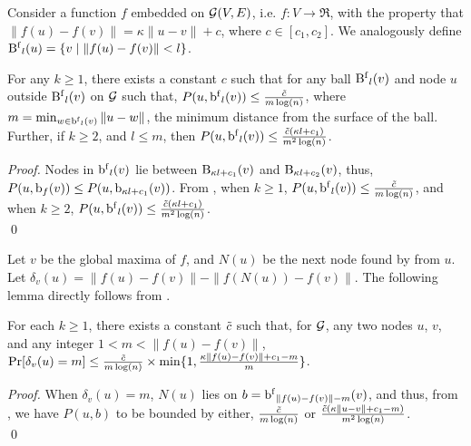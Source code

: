 Consider a function $f$ embedded on $\mathcal{G}(V,E)$, i.e. $f : V \to \Re$, with
the property that $\|f(u) - f(v)\| = \kappa\|u - v\| + c$, where $c \in [c_1,
c_2]$. We analogously define $\operatorname{B^{f}}_l(u) = \{ v \mid \|f(u) - f(v)\| < l \}$. 

\begin{lemma}
    \label{lm:link-to-ballf}
    For any $k \ge 1$, there exists a constant $c$ such that for any ball
    $\operatorname{B^{f}}_l(v)$ and node $u$ outside $\operatorname{B^{f}}_l(v)$ on $\mathcal{G}$ such that,
    $P(u,\operatorname{b^{f}}_l(v)) \le \frac {\tilde{c}}{m\log(n)}$, where $m = \min_{w \in
    \operatorname{b^{f}}_l(v)} \|u-w\|$, the minimum distance from the surface of the ball.
    Further, if $k \ge 2$, and $l \le m$, then $P(u,\operatorname{b^{f}}_l(v)) \le \frac
    {\tilde{c}(\kappa l+c_1)}{m^2\log(n)}$. 
\end{lemma}
\begin{proof}
    Nodes in $\operatorname{b^{f}}_l(v)$ lie between $\operatorname{B}_{\kappa l+c_1}(v)$ and
    $\operatorname{B}_{\kappa l+c_2}(v)$, thus, $P(u,\operatorname{b}_f(v)) \le  P(u,\operatorname{b}_{\kappa l+c_1}(v))$.
    From , when $k \ge 1$, $P(u,\operatorname{b^{f}}_l(v)) \le \frac
    {\tilde{c}}{m\log(n)}$, and when $k \ge 2$, $P(u,\operatorname{b^{f}}_l(v)) \le \frac
    {\tilde{c}(\kappa l+c_1)}{m^2\log(n)}$.
    \\ \qed
\end{proof}


Let $v$ be the global maxima of $f$, and $N(u)$ be the next node found by
\greedyalgo from $u$. Let $\delta_v(u) = \|f(u)-f(v)\| - \|f(N(u))-f(v)\|$. The following lemma
directly follows from .

\begin{lemma}
    \label{lm:rate}
    For each $k \ge 1$, there exists a constant $\tilde{c}$ such that, for
    $\mathcal{G}$, any two nodes $u$, $v$, and any integer $1 < m < \|f(u) - f(v)\|$,
    $\Pr[ \delta_v(u) = m ] \le \frac{\tilde{c}}{m \log(n)} \times \min \{ 1,
    \frac{ \kappa\|f(u)-f(v)\| + c_1 - m }{m} \}$.
\end{lemma}
\begin{proof}
    When $\delta_v(u) = m$,  $N(u)$ lies on $b = \operatorname{b^{f}}_{\|f(u)-f(v)\| -
    m}(v)$, and thus, from , we have $P(u,b)$ to be
    bounded by either, $\frac {\tilde{c}}{m\log(n)}$ or $\frac {\tilde{c}(\kappa\|u -
    v\| + c_1 - m)}{m^2\log(n)}$.
    \\ \qed
\end{proof}


